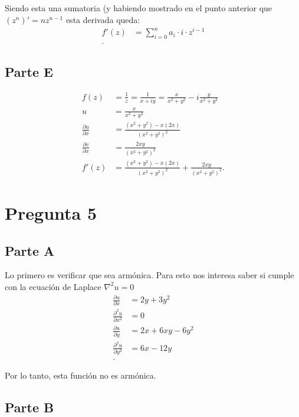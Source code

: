 \documentclass[12pt]{exam}
\begin{document}
Siendo esta una sumatoria (y habiendo mostrado en el punto anterior que $\left( z^{n} \right)' = nz^{n-1}$ esta derivada queda:
\begin{align*}
  f'\left( z \right)  &= \displaystyle\sum_{i=0}^{n} a_i \cdot i\cdot z^{i-1} \\
.\end{align*}

\subsection*{Parte E}

\begin{align*}
  f(z) &= \frac{1}{z} = \frac{1}{x + iy} = \frac{x}{x^2 + y^2} - i \frac{y}{x^2 + y^2}\\
  u &= \frac{x}{x^2 + y^2} \\
  \frac{\partial u}{\partial x} &= \frac{\left( x^2+y^2 \right) - x\left( 2x \right) }{\left( x^2 + y^2 \right)^{2}} \\
  \frac{\partial v}{\partial x}  &= \frac{2xy}{\left( x^2 + y^2 \right)^{2}} \\
  f'(z) &=  \frac{\left( x^2+y^2 \right) - x\left( 2x \right) }{\left( x^2 + y^2 \right)^{2}} +\frac{2xy}{\left( x^2 + y^2 \right)^{2}} 
.\end{align*}

\section*{Pregunta 5}

\subsection*{Parte A}

Lo primero es verificar que sea armónica. Para esto nos interesa saber si cumple con la ecuación de Laplace $\nabla ^2 u = 0 $ 
\begin{align*}
  \frac{\partial u}{\partial x}  &= 2y + 3y^2 \\
  \frac{\partial^2 u}{\partial x^2}  &= 0 \\
  \frac{\partial u}{\partial y}  &= 2x + 6xy - 6y^2 \\
  \frac{\partial^2 u}{\partial y^2} &= 6x - 12y \\
.\end{align*}

Por lo tanto, esta función no es armónica.

\subsection*{Parte B}
\end{document}

